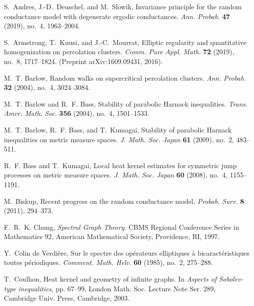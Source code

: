 \documentclass{article}
\numberwithin{equation}{section}
\theoremstyle{definition}
\theoremstyle{remark}
\begin{document}
\begin{thebibliography}{99}

S.~Andres, J.-D.~Deuschel, and M.~Slowik, Invariance principle for the random conductance model with degenerate ergodic conductances.
\emph{Ann. Probab.} \textbf{47} (2019), no.~4, 1963--2004.

S.~Armstrong, T.~Kuusi, and J.-C.~Mourrat, Elliptic regularity and quantitative homogenization on percolation clusters.
\emph{Comm. Pure Appl. Math.} \textbf{72} (2019), no.~8, 1717--1824. (Preprint arXiv:1609.09431, 2016).

M.~T. Barlow, Random walks on supercritical percolation clusters.
\emph{Ann. Probab.} \textbf{32} (2004), no.~4, 3024--3084.

M.~T. Barlow and R.~F. Bass, Stability of parabolic Harnack inequalities.
\emph{Trans. Amer. Math. Soc.} \textbf{356} (2004), no.~4, 1501--1533.

M.~T. Barlow, R.~F. Bass, and T.~Kumagai, Stability of parabolic Harnack inequalities on metric measure spaces.
\emph{J. Math. Soc. Japan} \textbf{61} (2009), no.~2, 483--511.

R.~F. Bass and T.~Kumagai, Local heat kernel estimates for symmetric jump processes on metric measure spaces.
\emph{J. Math. Soc. Japan} \textbf{60} (2008), no.~4, 1155--1191.

M.~Biskup, Recent progress on the random conductance model.
\emph{Probab. Surv.} \textbf{8} (2011), 294--373.

F.~R.~K. Chung, \emph{Spectral Graph Theory}.
CBMS Regional Conference Series in Mathematics 92, American Mathematical Society, Providence, RI, 1997.

Y.~Colin de Verdière, Sur le spectre des opérateurs elliptiques à bicaractéristiques toutes périodiques.
\emph{Comment. Math. Helv.} \textbf{60} (1985), no.~2, 275--288.

T.~Coulhon, Heat kernel and geometry of infinite graphs.
In \emph{Aspects of Sobolev-type inequalities},
pp. 67--99, London Math. Soc. Lecture Note Ser. 289,
Cambridge Univ. Press, Cambridge, 2003.


\end{thebibliography}
\end{document}

